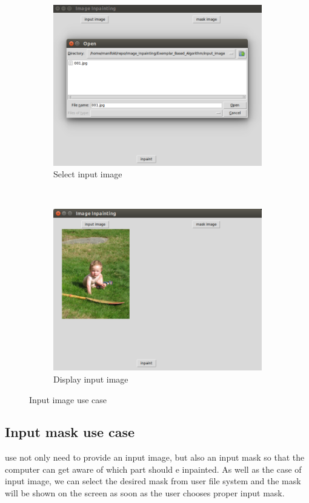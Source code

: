 \begin{figure}[H]
\centering
\begin{subfigure}{0.45\textwidth}
\includegraphics[width=\textwidth]{ex_input.png}
\caption{Select input image}
\end{subfigure}
~
\begin{subfigure}{0.45\textwidth}
\includegraphics[width=\textwidth]{ex_input_img.png}
\caption{Display input image}
\end{subfigure}
\caption{Input image use case}
\end{figure}

\subsection{Input mask use case}
use not only need to provide an input image, but also an input mask so that the computer can get aware of which part should e inpainted. As well as the case of input image, we can select the desired mask from user file system and the mask will be shown on the screen as soon as the user chooses proper input mask.

